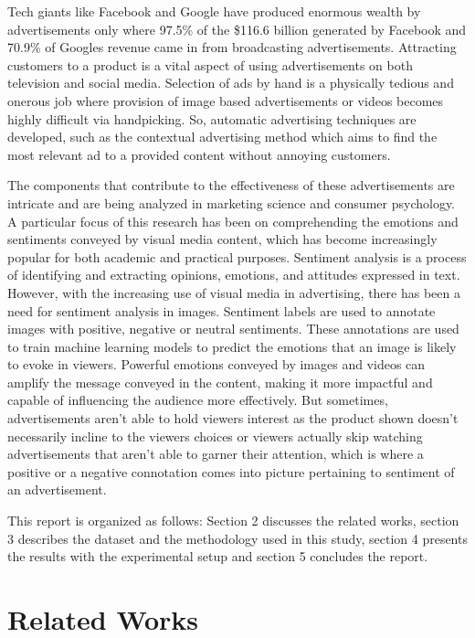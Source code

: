 \documentclass[conference]{IEEEtran}
\begin{document}
Tech giants like Facebook and Google have produced enormous wealth by advertisements only where 97.5\% of the \$116.6 billion generated by Facebook\cite{b1} and 70.9\% of Googles revenue\cite{b2} came in from broadcasting advertisements. Attracting customers to a product is a vital aspect of using  advertisements on both television and social media. Selection of ads by hand is a physically tedious and onerous job where provision of image based advertisements or videos becomes highly difficult via handpicking. So, automatic advertising techniques are developed, such as the contextual advertising method which aims to find the most relevant ad to a provided content without annoying customers.

The components that contribute to the effectiveness of these advertisements are intricate and are being analyzed in marketing science and consumer psychology. A particular focus of this research has been on comprehending the emotions and sentiments conveyed by visual media content, which has become increasingly popular for both academic and practical purposes. Sentiment analysis is a process of identifying and extracting opinions, emotions, and attitudes expressed in text. However, with the increasing use of visual media in advertising, there has been a need for sentiment analysis in images. Sentiment labels are used to annotate images with positive, negative or neutral sentiments. These annotations are used to train machine learning models to predict the emotions that an image is likely to evoke in viewers.
Powerful emotions conveyed by images and videos can amplify the message conveyed in the content, making it more impactful and capable of influencing the audience more effectively. But sometimes, advertisements aren’t able to hold viewers interest as the product shown doesn’t necessarily incline to the viewers choices or viewers actually skip watching advertisements that aren’t able to garner their attention, which is where a positive or a negative connotation comes into picture pertaining to sentiment of an advertisement.

This report is organized as follows: Section 2 discusses the related works, section 3 describes the dataset and the methodology used in this study, section 4 presents the results with the experimental setup and section 5 concludes the report.

\section{Related Works}
\end{document}
